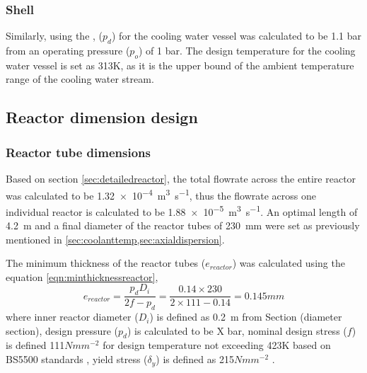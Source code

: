 \subsubsection{Shell}
Similarly, using the , ($p_d$) for the cooling water vessel was calculated to be 1.1 bar from an operating pressure ($p_o$) of 1 bar. The design temperature for the cooling water vessel is set as 313K, as it is the upper bound of the ambient temperature range of the cooling water stream. 

\subsection{Reactor dimension design}
\label{sec:reactordimensions}

\subsubsection{Reactor tube dimensions}
\label{sec:reactortube}
Based on section \ref{sec:detailedreactor}, the total flowrate across the entire reactor was calculated to be \SI{1.32e-4}{\cubic\m\per\s}, thus the flowrate across one individual reactor is calculated to be  \SI{1.88e-5}{\cubic\m\per\s}. An optimal length of \SI{4.2}{\metre} and a final diameter of the reactor tubes of \SI{230}{\milli \metre} were set as previously mentioned in \cref{sec:coolanttemp,sec:axialdispersion}. 

The minimum thickness of the reactor tubes ($e_{reactor}$) was calculated using the equation \ref{eqn:minthicknessreactor},
\begin{equation}
    e_{reactor} = \frac{p_dD_i}{2f-p_d} = \frac{0.14 \times 230}{2 \times 111 - 0.14} = 0.145mm
    \label{eqn:minthicknessreactor}
\end{equation}
where inner reactor diameter ($D_i$) is defined as \SI{0.2}{\metre} from Section (diameter section), design pressure ($p_d$) is calculated to be X bar, nominal design stress ($f$) is defined 111$Nmm^{-2}$ for design temperature not exceeding 423K based on BS5500 standards , yield stress ($\delta_y$) is defined as 215$Nmm^{-2}$ \cite{noauthor_unfired_nodate}.


